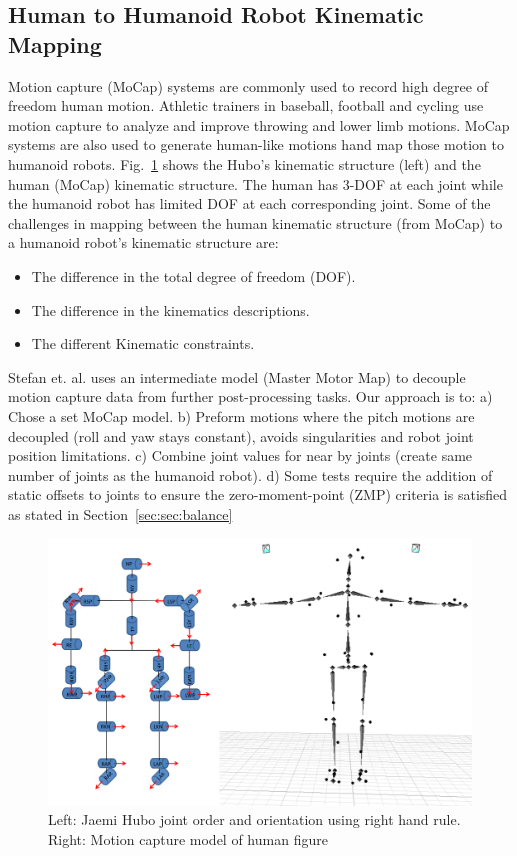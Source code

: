 \subsection{Human to Humanoid Robot Kinematic Mapping}\label{sec:sec:mocap}

Motion capture (MoCap) systems are commonly used to record high degree of freedom human motion.  
Athletic trainers in baseball, football and cycling use motion capture to analyze and improve throwing and lower limb motions\cite{Fleisig1996,barrentiine1998,Mochizuki1998,Akira1999}.
MoCap systems are also used to generate human-like motions hand map those motion to humanoid robots\cite{1545060,Polland2002}.  
Fig.~\ref{fig:mocap-joints} shows the Hubo's kinematic structure (left) and the human (MoCap) kinematic structure.
The human has 3-DOF at each joint while the humanoid robot has limited DOF at each corresponding joint.
Some of the challenges in mapping between the human kinematic structure (from MoCap) to a humanoid robot's kinematic structure are:

\begin{itemize}
	\item The difference in the total degree of freedom (DOF). 
	\item	The difference in the kinematics descriptions. 
	\item	The different Kinematic constraints.
\end{itemize}

Stefan et. al.\cite{5756898} uses an intermediate model (Master Motor Map) to decouple motion capture data from further post-processing tasks. 
Our approach is to: 
a) Chose a set MoCap model.  
b) Preform motions where the pitch motions are decoupled (roll and yaw stays constant), avoids singularities and robot joint position limitations.  
c) Combine joint values for near by joints (create same number of joints as the humanoid robot).  
d) Some tests require the addition of static offsets to joints to ensure the zero-moment-point (ZMP) criteria is satisfied as stated in Section~\ref{sec:sec:balance}

\begin{figure}[t]
  \centering
\includegraphics[width=1.0\columnwidth]{./pix/mocapJoints.png}
  \caption{Left: Jaemi Hubo joint order and orientation using right hand rule.  Right: Motion capture model of human figure}
  \label{fig:mocap-joints}
\end{figure}



